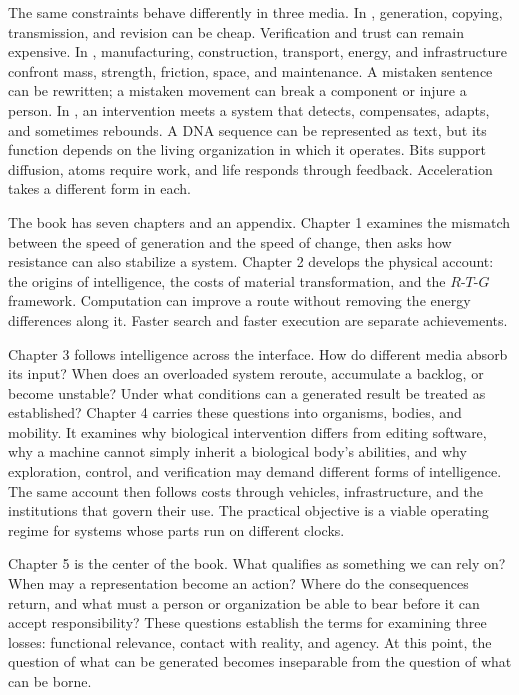 The same constraints behave differently in three media. In , generation, copying, transmission, and revision can be cheap. Verification and trust can remain expensive. In , manufacturing, construction, transport, energy, and infrastructure confront mass, strength, friction, space, and maintenance. A mistaken sentence can be rewritten; a mistaken movement can break a component or injure a person. In , an intervention meets a system that detects, compensates, adapts, and sometimes rebounds. A DNA sequence can be represented as text, but its function depends on the living organization in which it operates. Bits support diffusion, atoms require work, and life responds through feedback. Acceleration takes a different form in each.

The book has seven chapters and an appendix. Chapter 1 examines the mismatch between the speed of generation and the speed of change, then asks how resistance can also stabilize a system. Chapter 2 develops the physical account: the origins of intelligence, the costs of material transformation, and the $R$-$T$-$G$ framework. Computation can improve a route without removing the energy differences along it. Faster search and faster execution are separate achievements.

Chapter 3 follows intelligence across the interface. How do different media absorb its input? When does an overloaded system reroute, accumulate a backlog, or become unstable? Under what conditions can a generated result be treated as established? Chapter 4 carries these questions into organisms, bodies, and mobility. It examines why biological intervention differs from editing software, why a machine cannot simply inherit a biological body's abilities, and why exploration, control, and verification may demand different forms of intelligence. The same account then follows costs through vehicles, infrastructure, and the institutions that govern their use. The practical objective is a viable operating regime for systems whose parts run on different clocks.

Chapter 5 is the center of the book. What qualifies as something we can rely on? When may a representation become an action? Where do the consequences return, and what must a person or organization be able to bear before it can accept responsibility? These questions establish the terms for examining three losses: functional relevance, contact with reality, and agency. At this point, the question of what can be generated becomes inseparable from the question of what can be borne.

